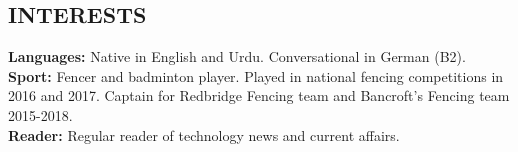 \documentclass[margin, 10pt]{res} %
\begin{document}
\begin{resume}

\section{INTERESTS} 
\textbf{Languages:} Native in English and Urdu. Conversational in German (B2).\\
\textbf{Sport:} Fencer and badminton player. Played in national fencing competitions in 2016 and 2017. Captain for Redbridge Fencing team and Bancroft's Fencing team 2015-2018.\\
\textbf{Reader:} Regular reader of technology news and current affairs.



\end{resume}
\end{document}

